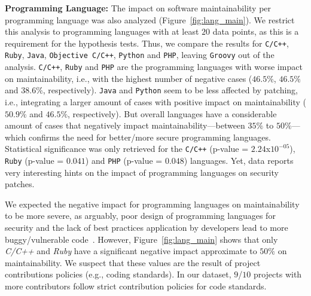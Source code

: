 \documentclass[10pt,conference]{IEEEtran}
\begin{document}
\textbf{Programming Language:} The impact on software maintainability per programming 
language was also analyzed (Figure~\ref{fig:lang_main}). We restrict 
this analysis to programming languages with at least $20$ data points, as this 
is a requirement for the hypothesis tests. Thus, we compare the results for 
\texttt{C/C++}, \texttt{Ruby}, \texttt{Java}, \texttt{Objective C/C++}, 
\texttt{Python} and \texttt{PHP}, leaving \texttt{Groovy} out of the analysis.
\texttt{C/C++}, \texttt{Ruby} and 
\texttt{PHP} are the programming languages with worse 
impact on maintainability, i.e., with the highest number of negative cases ($46.5\%$, $46.5\%$ and $38.6\%$, respectively). \texttt{Java} and \texttt{Python} 
seem to be less affected by patching, i.e., integrating a larger amount of cases with positive impact on maintainability ($50.9\%$ and $46.5\%$, respectively). But overall 
languages have a considerable amount of cases that negatively impact  
maintainability---between $35\%$ to $50\%$---which 
confirms the need for better/more secure programming languages. 
Statistical significance was only retrieved for the \texttt{C/C++} 
(p-value = $2.24$x$10^{-05}$), \texttt{Ruby} (p-value = $0.041$) and \texttt{PHP} 
(p-value = $0.048$) languages. Yet, data reports very interesting hints on the impact 
of programming languages on security patches.

We expected the negative impact for programming languages on
maintainability to be more severe, as arguably, poor design of programming
languages for security and the lack of best practices application by developers lead to more buggy/vulnerable
code~\cite{Ray:2017:LSP:3144574.3126905, 2019arXiv190110220B}. However,
Figure~\ref{fig:lang_main} shows that only \emph{C/C++} and \emph{Ruby} have 
a significant negative impact approximate to $50\%$ on 
maintainability. We suspect that these values are
the result of project contributions policies (e.g., coding standards). In our dataset, 
$9$/$10$ projects with more contributors follow strict contribution 
policies for code standards. %
\end{document}
